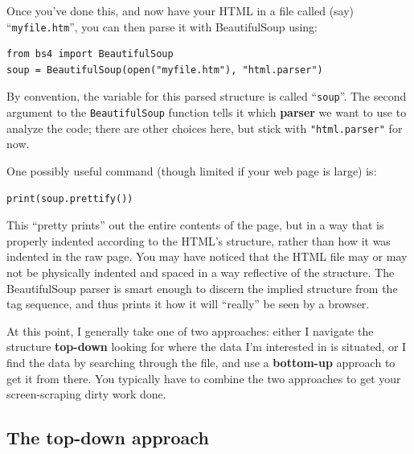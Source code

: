 Once you've done this, and now have your HTML in a file called (say)
``\texttt{myfile.htm}'', you can then parse it with BeautifulSoup using:


\begin{Verbatim}[fontsize=\small,samepage=true,frame=single,framesep=3mm]
from bs4 import BeautifulSoup
soup = BeautifulSoup(open("myfile.htm"), "html.parser")
\end{Verbatim}


By convention, the variable for this parsed structure is called
``\texttt{soup}''. The second argument to the \texttt{BeautifulSoup} function
tells it which \textbf{parser} we want to use to analyze the code; there are
other choices here, but stick with \texttt{"html.parser"} for now.

One possibly useful command (though limited if your web page is large) is:


\begin{Verbatim}[fontsize=\small,samepage=true,frame=single,framesep=3mm]
print(soup.prettify())
\end{Verbatim}

This ``pretty prints'' out the entire contents of the page, but in a way that
is properly indented according to the HTML's structure, rather than how it was
indented in the raw page. You may have noticed that the HTML file may or may
not be physically indented and spaced in a way reflective of the structure. The
BeautifulSoup parser is smart enough to discern the implied structure from the
tag sequence, and thus prints it how it will ``really'' be seen by a browser.


At this point, I generally take one of two approaches: either I navigate the
structure \textbf{top-down} looking for where the data I'm interested in is
situated, or I find the data by searching through the file, and use a
\textbf{bottom-up} approach to get it from there. You typically have to combine
the two approaches to get your screen-scraping dirty work done.

\subsection{The top-down approach}

